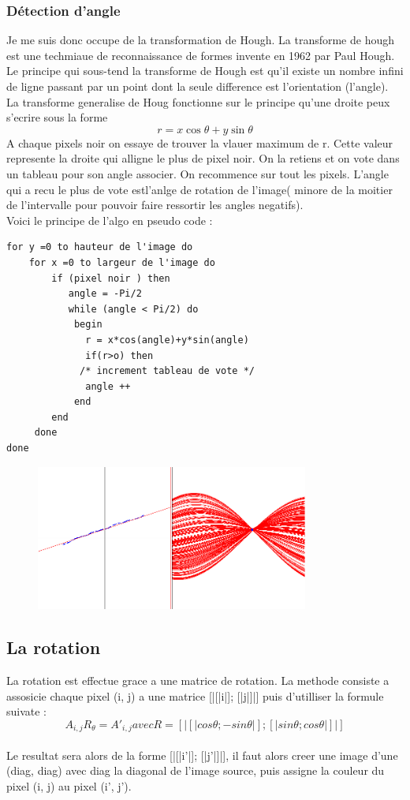 \documentclass[12pt]{article}
\begin{document}
\subsubsection{Détection d'angle}
Je me suis donc occupe de la transformation de Hough. La transforme de hough est une techmiaue de reconnaissance de formes invente en 1962 par Paul Hough.
Le principe qui sous-tend la transforme de Hough est qu'il existe un nombre infini de ligne passant par un point dont la seule difference est l'orientation (l'angle). La transforme generalise de Houg fonctionne sur le principe qu'une droite peux s'ecrire sous la forme 
\[r = x\cos{\theta}+y\sin{\theta}\]
A chaque pixels noir on essaye de trouver la vlauer maximum de r. Cette valeur represente la droite qui alligne le plus de pixel noir. On la retiens et on vote dans un tableau pour son angle associer. On recommence sur tout les pixels. L'angle qui a recu le plus de vote estl'anlge de rotation de l'image( minore de la moitier de l'intervalle pour pouvoir faire ressortir les angles negatifs).
\\
\newpage
Voici le principe de l'algo en pseudo code :
\begin{lstlisting}
for y =0 to hauteur de l'image do
    for x =0 to largeur de l'image do
        if (pixel noir ) then
           angle = -Pi/2
           while (angle < Pi/2) do
            begin
              r = x*cos(angle)+y*sin(angle)
              if(r>o) then
             /* increment tableau de vote */          
              angle ++
            end
        end
     done
done

\end{lstlisting} 

\begin{figure}[h]
\centering
\includegraphics[width=0.80\textwidth]{img/hough.png}
\end{figure}
\newpage
\subsection{La rotation}
La rotation est effectue grace a une matrice de rotation. La methode consiste a assosicie chaque pixel (i, j) a une matrice [|[|i|]; [|j|]|] puis d'utilliser la formule suivate :
\\
\[A_{i,j}R_{\theta} = A'_{i,j} avec R = [|[|cos \theta; -sin \theta|]; [|sin \theta; cos \theta|]|] \]
\\
Le resultat sera alors de la forme [|[|i'|]; [|j'|]|], il faut alors creer une image d'une (diag, diag) avec diag la diagonal de l'image source, puis assigne la couleur du pixel (i, j) au pixel (i', j').
\end{document}
